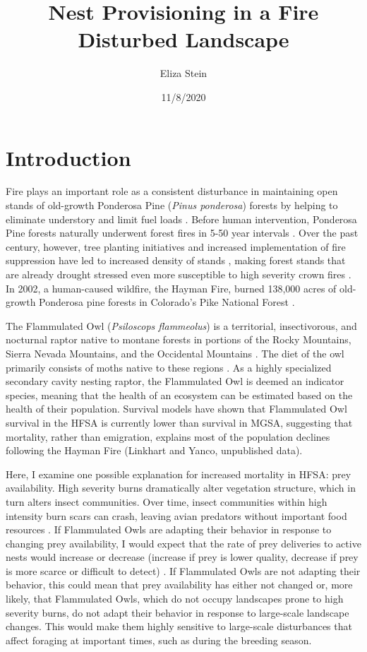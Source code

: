 \documentclass[
]{article}
\title{Nest Provisioning in a Fire Disturbed Landscape}
\author{Eliza Stein}
\date{11/8/2020}
\begin{document}
\maketitle

\hypertarget{introduction}{%
\section{Introduction}\label{introduction}}

Fire plays an important role as a consistent disturbance in maintaining
open stands of old-growth Ponderosa Pine (\emph{Pinus ponderosa})
forests by helping to eliminate understory and limit fuel loads
\citep{veblen2000climatic}. Before human intervention, Ponderosa Pine
forests naturally underwent forest fires in 5-50 year intervals
\citep{veblen2000climatic}. Over the past century, however, tree
planting initiatives and increased implementation of fire suppression
have led to increased density of stands \citep{griffis2001understory},
making forest stands that are already drought stressed even more
susceptible to high severity crown fires \citep{veblen2000climatic}. In
2002, a human-caused wildfire, the Hayman Fire, burned 138,000 acres of
old-growth Ponderosa pine forests in Colorado's Pike National Forest
\citep{graham2003hayman}.

The Flammulated Owl (\emph{Psiloscops flammeolus}) is a territorial,
insectivorous, and nocturnal raptor native to montane forests in
portions of the Rocky Mountains, Sierra Nevada Mountains, and the
Occidental Mountains \citep{linkhart2013flammulated}. The diet of the
owl primarily consists of moths native to these regions
\citep{linkhart2013flammulated}. As a highly specialized secondary
cavity nesting raptor, the Flammulated Owl is deemed an indicator
species, meaning that the health of an ecosystem can be estimated based
on the health of their population. Survival models have shown that
Flammulated Owl survival in the HFSA is currently lower than survival in
MGSA, suggesting that mortality, rather than emigration, explains most
of the population declines following the Hayman Fire (Linkhart and
Yanco, unpublished data).

Here, I examine one possible explanation for increased mortality in
HFSA: prey availability. High severity burns dramatically alter
vegetation structure, which in turn alters insect communities. Over
time, insect communities within high intensity burn scars can crash,
leaving avian predators without important food resources
\citep{nappi2010effect}. If Flammulated Owls are adapting their behavior
in response to changing prey availability, I would expect that the rate
of prey deliveries to active nests would increase or decrease (increase
if prey is lower quality, decrease if prey is more scarce or difficult
to detect) \citep{zarybnicka2009tengmalm}. If Flammulated Owls are not
adapting their behavior, this could mean that prey availability has
either not changed or, more likely, that Flammulated Owls, which do not
occupy landscapes prone to high severity burns, do not adapt their
behavior in response to large-scale landscape changes. This would make
them highly sensitive to large-scale disturbances that affect foraging
at important times, such as during the breeding season.
\end{document}
